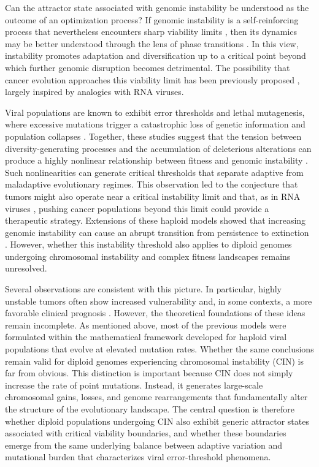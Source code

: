 \documentclass[10pt, aps, rmp,  twocolumn, superscriptaddress, floatfix, showkeys]{revtex4-2}
\begin{document}
Can the attractor state associated with genomic instability be understood as the outcome of an optimization 
process? If genomic instability is a self-reinforcing process that nevertheless encounters sharp viability 
limits \cite{hosea2024two}, then its dynamics may be better understood through the lens of phase transitions 
\cite{sole2011phase}. In this view, instability promotes adaptation and diversification up to a critical 
point beyond which further genomic disruption becomes detrimental. The possibility that cancer evolution 
approaches this viability limit has been previously proposed 
\cite{gatenby2002application,Sole2003-ne,Sole2004-bf,tejero2010effect,sole2014can}, largely inspired by analogies with RNA viruses. 

Viral populations are known to exhibit error thresholds and lethal mutagenesis, where excessive mutations trigger a catastrophic loss of genetic information and population collapses \cite{manrubia2010pathways,perales2015antiviral,Sardanyes2024}. Together, these studies suggest that the tension between diversity-generating processes and the accumulation of deleterious alterations can produce a highly nonlinear relationship between fitness and genomic instability \cite{SoleBioessasy2023}. Such nonlinearities can generate critical thresholds that separate adaptive from maladaptive evolutionary regimes. This observation led to the conjecture that tumors might also operate near a critical instability limit and that, as in RNA viruses \cite{crotty2001rna,sole2006information,swanstrom2022lethal,chatterjee2023molnupiravir}, pushing cancer populations beyond this limit could provide a therapeutic strategy. Extensions of these haploid models showed that increasing genomic instability can cause an abrupt transition from persistence to extinction \cite{Sole2003-ne,Sole2004-bf,Sardanyes2017JMB,Sardanyes2018SciRep,Sardanyes2018RSOS}. However, whether this instability threshold also applies to diploid genomes undergoing chromosomal instability and complex fitness landscapes remains unresolved.

Several observations are consistent with this picture. In particular, highly unstable tumors often show 
increased vulnerability and, in some contexts, a more favorable clinical prognosis 
\cite{andor2017genomic,van2021chromosomal,zerbib2025targeting}. However, the theoretical foundations of these 
ideas remain incomplete. As mentioned above, most of the previous models were formulated within the 
mathematical framework developed for
haploid viral populations that evolve at elevated mutation rates. Whether the same conclusions remain valid 
for diploid genomes experiencing chromosomal instability (CIN) is far from obvious.
This distinction is important because CIN does not simply increase the rate of point mutations. Instead, it 
generates large-scale chromosomal gains, losses, and genome rearrangements that fundamentally alter the 
structure of the evolutionary landscape. The central question is therefore whether diploid populations 
undergoing CIN also exhibit generic attractor states associated with critical viability boundaries, and 
whether these boundaries emerge from the same underlying balance between adaptive variation and mutational 
burden that characterizes viral error-threshold phenomena.
\end{document}

